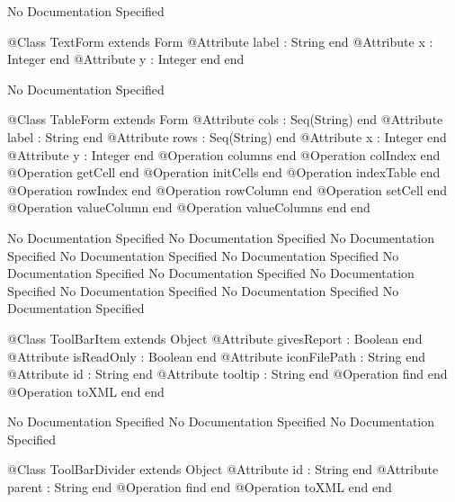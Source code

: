 No Documentation Specified
\begin{Interface}
@Class TextForm extends Form
  @Attribute label : String end
  @Attribute x : Integer end
  @Attribute y : Integer end
end
\end{Interface}
No Documentation Specified
\begin{Interface}
@Class TableForm extends Form
  @Attribute cols : Seq(String) end
  @Attribute label : String end
  @Attribute rows : Seq(String) end
  @Attribute x : Integer end
  @Attribute y : Integer end
  @Operation columns end
  @Operation colIndex end
  @Operation getCell end
  @Operation initCells end
  @Operation indexTable end
  @Operation rowIndex end
  @Operation rowColumn end
  @Operation setCell end
  @Operation valueColumn end
  @Operation valueColumns end
end
\end{Interface}
No Documentation Specified
No Documentation Specified
No Documentation Specified
No Documentation Specified
No Documentation Specified
No Documentation Specified
No Documentation Specified
No Documentation Specified
No Documentation Specified
No Documentation Specified
No Documentation Specified
\begin{Interface}
@Class ToolBarItem extends Object
  @Attribute givesReport : Boolean end
  @Attribute isReadOnly : Boolean end
  @Attribute iconFilePath : String end
  @Attribute id : String end
  @Attribute tooltip : String end
  @Operation find end
  @Operation toXML end
end
\end{Interface}
No Documentation Specified
No Documentation Specified
No Documentation Specified
\begin{Interface}
@Class ToolBarDivider extends Object
  @Attribute id : String end
  @Attribute parent : String end
  @Operation find end
  @Operation toXML end
end
\end{Interface}
